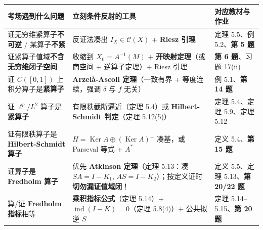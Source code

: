 \documentclass[11pt,a4paper]{article}
\newcounter{none}
\begin{document}
{\def\LTcaptype{none} %
{\small\renewcommand{\arraystretch}{1.38}\setlength{\tabcolsep}{5pt}
\begin{longtable}[]{@{}
  >{\raggedright\arraybackslash}p{}
  >{\raggedright\arraybackslash}p{}
  >{\raggedright\arraybackslash}p{}@{}}
\toprule\noalign{}
\rowcolor{AccentSoft}
\begin{minipage}[b]{\linewidth}\raggedright
考场遇到什么问题
\end{minipage} & \begin{minipage}[b]{\linewidth}\raggedright
立刻条件反射的工具
\end{minipage} & \begin{minipage}[b]{\linewidth}\raggedright
对应教材与作业
\end{minipage} \\
\midrule\noalign{}
\endhead
\bottomrule\noalign{}
\endlastfoot
证无穷维紧算子\textbf{不可逆} / 某算子\textbf{不紧} & 反证法凑出 \(I_X \in \mathcal{C}(X)\) + \textbf{Riesz 引理} & 定理 5.5、例 5.2、\textbf{第 5 题} \\
证紧算子值域\textbf{不含无穷维闭子空间} & 收缩到 \(X_0 = A^{-1}(M)\) + \textbf{开映射定理}（或商空间 + 逆算子定理）+ Riesz 引理 & \textbf{第 6 题}、习题 17(ii) \\
证 \(C([0,1])\) 上积分算子是\textbf{紧算子} & \textbf{Arzelà-Ascoli 定理}（一致有界 + 等度连续，强调 \(\delta\) 与 \(f\) 无关） & 例 5.1、\textbf{第 14 题} \\
证 \(\ell^p / L^2\) 算子是\textbf{紧算子} & 有限秩截断逼近（定理 5.4）或 \textbf{Hilbert-Schmidt 判定}（定理 5.12(5)） & 定理 5.4、定理 5.9、定理 5.12 \\
证有限秩算子是 \textbf{Hilbert-Schmidt 算子} & \(H = \operatorname{Ker} A \oplus (\operatorname{Ker} A)^\perp\) 凑基，或 Parseval 等式 + \(A^*\) & 定义 5.4、\textbf{第 15 题} \\
证算子是 \textbf{Fredholm 算子} & 优先 \textbf{Atkinson 定理}（定理 5.13：凑 \(SA = I - K_1, \, AS = I - K_2\)）；按定义证时\textbf{切勿漏证值域闭}！ & 定义 5.5、定理 5.13、\textbf{第 20/22 题} \\
算/证 \textbf{Fredholm 指标}相等 & \textbf{乘积指标公式}（定理 5.14）+ \textbf{\(\operatorname{ind}(I - K) = 0\)}（定理 5.8(4)）+ 公共拟逆 \(S\) & 定理 5.14--5.15、\textbf{第 20 题} \\
\end{longtable}
}
}
\end{document}

